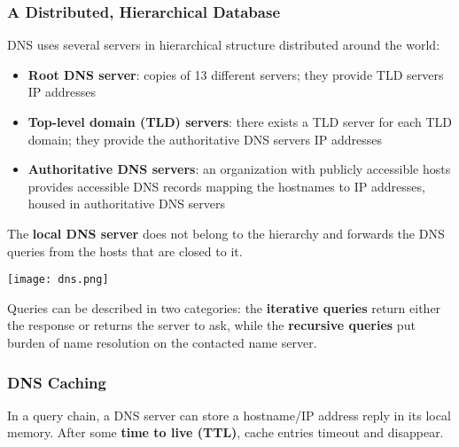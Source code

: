 \documentclass{article}
\begin{document}
\subsubsection*{A Distributed, Hierarchical Database}
DNS uses several servers in hierarchical structure distributed around the world:
\begin{itemize}
    \item \textbf{Root DNS server}: copies of 13 different servers; they provide TLD servers IP addresses
    \item \textbf{Top-level domain (TLD) servers}: there exists a TLD server for each TLD domain; they provide the authoritative DNS servers IP addresses
    \item \textbf{Authoritative DNS servers}: an organization with publicly accessible hosts provides accessible DNS records mapping the hostnames to IP addresses, housed in authoritative DNS servers
\end{itemize}
The \textbf{local DNS server} does not belong to the hierarchy and forwards the DNS queries from the hosts that are closed to it. \\
\begin{center}
    \texttt{[image: dns.png]}
\end{center}
Queries can be described in two categories: the \textbf{iterative queries} return either the response or returns the server to ask, while the \textbf{recursive queries} put burden of name resolution on the contacted name server.
\subsubsection*{DNS Caching}
In a query chain, a DNS server can store a hostname/IP address reply in its local memory.
After some \textbf{time to live (TTL)}, cache entries timeout and disappear.
\end{document}
